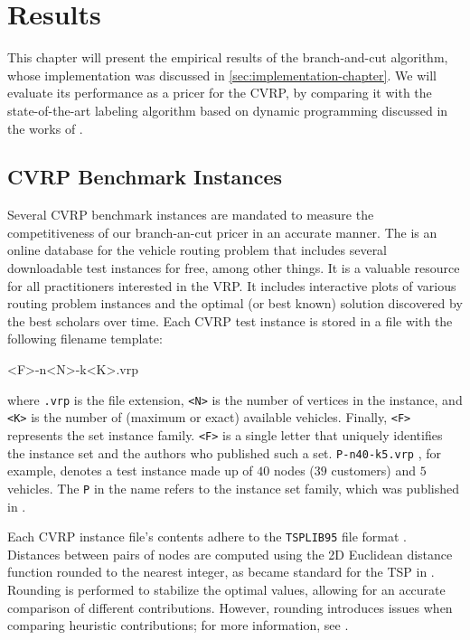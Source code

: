 \chapter{Results}
\label{sec:results}

This chapter will present the empirical results
of the branch-and-cut algorithm,
whose implementation was discussed in \cref{sec:implementation-chapter}.
We will evaluate its performance as a pricer for the CVRP,
by comparing it with
the state-of-the-art labeling algorithm based on dynamic programming
discussed in the works of \textcite{pessoa2020generic, sadykov2021bucket}.

\medskip

\section{CVRP Benchmark Instances}
\label{sec:results-benchmark-instances}

Several CVRP benchmark instances are mandated to measure the competitiveness
of our branch-an-cut pricer in an accurate manner.
The 
is an online database for the vehicle routing problem that includes
several downloadable test instances for free, among other things.
It is a valuable resource for all practitioners interested in the VRP.
It includes interactive plots of various routing problem instances
and the optimal (or best known) solution discovered by the best scholars over time.
Each CVRP test instance is stored in a file with the following filename template:
\begin{center}
	\begin{LVerbatim}
		<F>-n<N>-k<K>.vrp
	\end{LVerbatim}
\end{center}
where \texttt{.vrp} is the file extension,
\texttt{<N>} is the number of vertices in the instance, and
\texttt{<K>} is the number of (maximum or exact) available vehicles.
Finally, \texttt{<F>} represents the set instance family.
\texttt{<F>} is a single letter that uniquely identifies the instance
set and the authors who published such a set.
\texttt{P-n40-k5.vrp} , for example, denotes a test instance made up
of $40$ nodes ($39$ customers) and $5$ vehicles.
The \texttt{P} in the name refers to the instance set family,
which was published in \textcite{augerat1995}.

Each CVRP instance file's contents adhere
to the \texttt{TSPLIB95} file format \parencite{reinelt1995}.
Distances between pairs of nodes are computed
using the 2D Euclidean distance function rounded to the nearest integer,
as became standard for the TSP in \textcite{reinelt1991}.
Rounding is performed to stabilize the optimal values,
allowing for an accurate comparison of different contributions.
However, rounding introduces issues when comparing heuristic contributions;
for more information, see \textcite{uchoa2017}.

